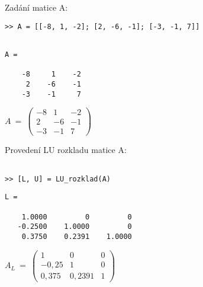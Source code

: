 \documentclass[a4paper,10pt]{article}
\begin{document}
\par Zadání matice A:

\begin{verbatim}
>> A = [[-8, 1, -2]; [2, -6, -1]; [-3, -1, 7]]
\end{verbatim}


\begin{minipage}[t]{.5\textwidth}
\begin{verbatim}

A =

    -8     1    -2
     2    -6    -1
    -3    -1     7

\end{verbatim}
\end{minipage}%
\begin{minipage}[t]{.5\textwidth}

\bigskip

$
A~=~
\left( \begin{array}{rrr}
-8 &  1 & -2 \\
 2 & -6 & -1 \\
-3 & -1 &  7 
\end{array} \right)
$

\vfill

\end{minipage}



\par Provedení LU rozkladu matice A:

\begin{verbatim}

>> [L, U] = LU_rozklad(A)

\end{verbatim}

\begin{minipage}[t]{.5\textwidth}
\begin{verbatim}
L =

    1.0000         0         0
   -0.2500    1.0000         0
    0.3750    0.2391    1.0000

\end{verbatim}
\end{minipage}%
\begin{minipage}[t]{.5\textwidth}

\bigskip

$
A_L~=~
\left( \begin{array}{rrr}
  1 &  0 & 0 \\
 -0,25 & 1 & 0 \\
  0,375 & 0,2391 &  1 
\end{array} \right)
$

\vfill

\end{minipage}
\end{document}
